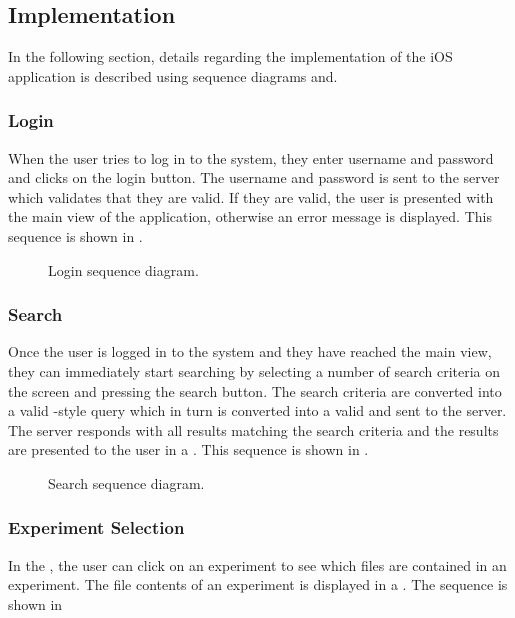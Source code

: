 \subsection{Implementation}
In the following section, details regarding the implementation of the iOS application is described using sequence diagrams and.

\subsubsection{Login}

When the user tries to log in to the system, they enter username and password and clicks on the login button. The username and password is sent to the server which validates that they are valid. If they are valid, the user is presented with the main view of the application, otherwise an error message is displayed. This sequence is shown in  .

\begin{figure}[ht]
\caption{Login sequence diagram.}
\label{fig:ios_sequence_login}
\end{figure}

\subsubsection{Search}

Once the user is logged in to the system and they have reached the main view, they can immediately start searching by selecting a number of search criteria on the screen and pressing the search button. The search criteria are converted into a valid -style query which in turn is converted into a valid  and sent to the server. The server responds with all results matching the search criteria and the results are presented to the user in a . This sequence is shown in .

\begin{figure}[ht]
\caption{Search sequence diagram.}
\label{fig:ios_sequence_search}
\end{figure}

\subsubsection{Experiment Selection}

In the , the user can click on an experiment to see which files are contained in an experiment. The file contents of an experiment is displayed in a . The sequence is shown in  


